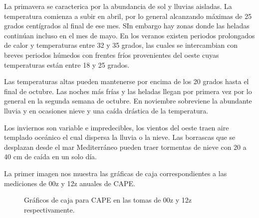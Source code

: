 \documentclass{article} %
\begin{document}
La primavera se caracterica por la abundancia de sol y lluvias aisladas. La temperatura comienza a subir en abril, por lo general alcanzando máximas de 25 grados centígrados al final de ese mes. SIn embargo hay zonas donde las heladas continúan incluso en el mes de mayo. En los veranos existen periodos prolongados de calor y temperaturas entre 32 y 35 grados, las cuales se intercambian con breves periodos húmedos con frentes fríos provenientes del oeste cuyas temperaturas están entre 18 y 25 grados. 

\vspace{0.5 cm}

Las temperaturas altas pueden mantenerse por encima de los 20 grados hasta el final de octubre. Las noches más frías y las heladas llegan por primera vez por lo general en la segunda semana de octubre. En noviembre sobreviene la abundante lluvia y en ocasiones nieve y una caída drástica de la temperatura. 

\vspace{0.5 cm}

Los inviernos son variable e impredecibles, los vientos del oeste traen aire templado oceánico el cual dispersa la lluvia o la nieve. Las borrascas que se desplazan desde el mar Mediterráneo pueden traer tormentas de nieve con 20 a 40 cm de caída en un solo día. 

\vspace{0.5 cm}

La primer imagen nos muestra las gráficas de caja correspondientes a las mediciones de 00z y 12z anuales de CAPE.    

\begin{center}%

\begin{figure}%
    \centering
    \qquad
    \caption{Gráficos de caja para CAPE en las tomas de 00z y 12z respectivamente.}%
\end{figure}
	
\end{center}%
\end{document}
